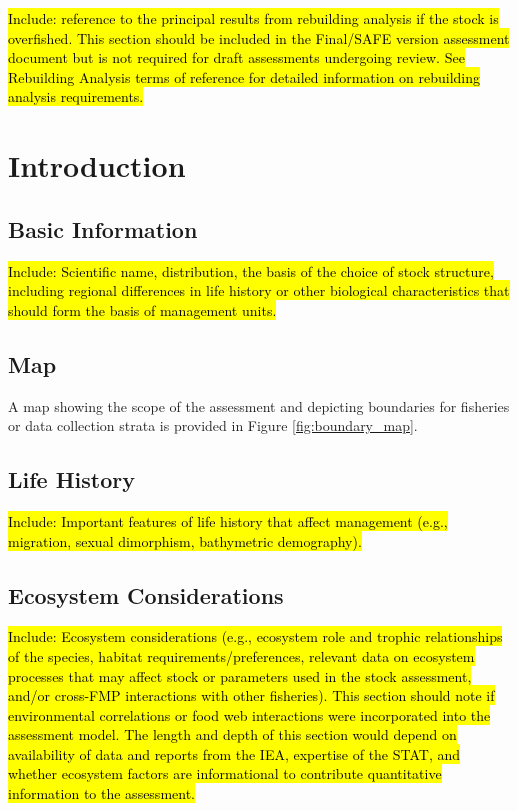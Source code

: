 \documentclass[12pt,]{article}
\begin{document}
\hl{Include: reference to the principal results from rebuilding analysis if the 
stock is overfished. This section should be included in the Final/SAFE version 
assessment document but is not required for draft assessments undergoing review. 
See Rebuilding Analysis terms of reference for detailed information on 
rebuilding analysis requirements.}

\FloatBarrier

\newpage

\renewcommand{\thefigure}{\arabic{figure}}
\renewcommand{\thetable}{\arabic{table}}

\setcounter{figure}{0} \setcounter{table}{0}

\section{Introduction}\label{introduction}

\subsection{Basic Information}\label{basic-information}

\hl{Include: Scientific name, distribution, the basis of the choice of stock structure, 
including regional differences in life history or other biological characteristics 
that should form the basis of management units.}

\subsection{Map}\label{map}

A map showing the scope of the assessment and depicting boundaries for
fisheries or data collection strata is provided in Figure
\ref{fig:boundary_map}.

\subsection{Life History}\label{life-history}

\hl{Include: Important features of life history that affect management (e.g., migration, 
sexual dimorphism, bathymetric demography).}

\subsection{Ecosystem Considerations}\label{ecosystem-considerations-1}

\hl{Include: Ecosystem considerations (e.g., ecosystem role and trophic relationships of 
the species, habitat requirements/preferences, relevant data on ecosystem processes 
that may affect stock or parameters used in the stock assessment, and/or cross-FMP 
interactions with other fisheries). This section should note if environmental 
correlations or food web interactions were incorporated into the assessment model. 
The length and depth of this section would depend on availability of data and reports 
from the IEA, expertise of the STAT, and whether ecosystem factors are informational 
to contribute quantitative information to the assessment.}
\end{document}
